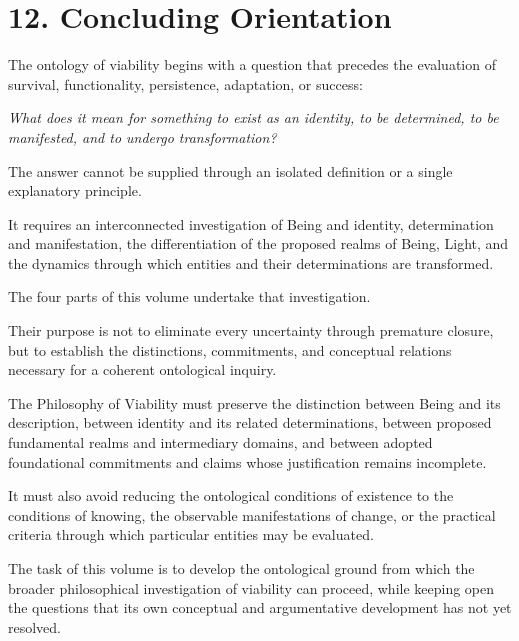 \section*{12. Concluding Orientation}

The ontology of viability begins with a question
that precedes the evaluation of survival,
functionality, persistence, adaptation, or success:

\begin{center}
    \textit{What does it mean for something to exist
    as an identity, to be determined, to be manifested,
    and to undergo transformation?}
\end{center}

The answer cannot be supplied through an isolated
definition or a single explanatory principle.

It requires an interconnected investigation
of Being and identity, determination and
manifestation, the differentiation of the proposed
realms of Being, Light, and the dynamics through
which entities and their determinations are
transformed.

The four parts of this volume undertake that
investigation.

Their purpose is not to eliminate every uncertainty
through premature closure, but to establish
the distinctions, commitments, and conceptual
relations necessary for a coherent ontological
inquiry.

The Philosophy of Viability must preserve
the distinction between Being and its description,
between identity and its related determinations,
between proposed fundamental realms and
intermediary domains, and between adopted
foundational commitments and claims whose
justification remains incomplete.

It must also avoid reducing the ontological
conditions of existence to the conditions
of knowing, the observable manifestations
of change, or the practical criteria through
which particular entities may be evaluated.

The task of this volume is to develop the
ontological ground from which the broader
philosophical investigation of viability can
proceed, while keeping open the questions
that its own conceptual and argumentative
development has not yet resolved.

\cleardoublepage

